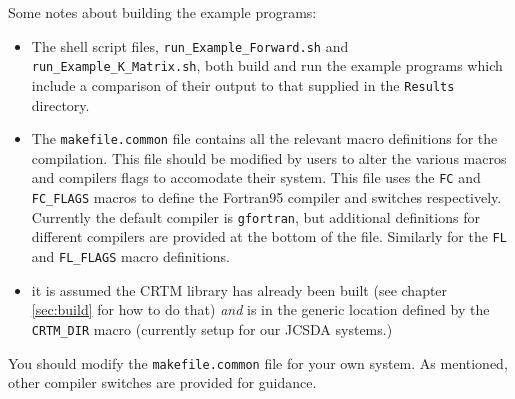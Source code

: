 Some notes about building the example programs:
\begin{itemize}
  \item The shell script files, \texttt{run\_Example\_Forward.sh} and \texttt{run\_Example\_K\_Matrix.sh}, both build and run the example programs which include a comparison of their output to that supplied in the \texttt{Results} directory.
  \item The \texttt{makefile.common} file contains all the relevant macro definitions for the compilation. This file should be modified by users to alter the various macros and compilers flags to accomodate their system.  This file uses the \texttt{FC} and \texttt{FC\_FLAGS} macros to define the Fortran95 compiler and switches respectively. Currently the default compiler is \texttt{gfortran}, but additional definitions for different compilers are provided at the bottom of the file. Similarly for the \texttt{FL} and \texttt{FL\_FLAGS} macro definitions.
  \item it is assumed the CRTM library has already been built (see chapter \ref{sec:build} for how to do that) \emph{and} is in the generic location defined by the \texttt{CRTM\_DIR} macro (currently setup for our JCSDA systems.)
\end{itemize}
You should modify the \texttt{makefile.common} file for your own system. As mentioned, other compiler switches are provided for guidance. 




